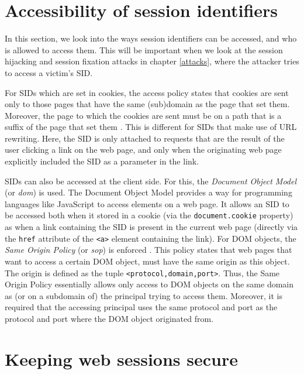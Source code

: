 \section{Accessibility of session identifiers}

In this section, we look into the ways session identifiers can be accessed, and who is allowed to access them. This will be important when we look at the \gls{session hijacking} and \gls{session fixation} attacks in chapter \ref{attacks}, where the attacker tries to access a victim's SID.

\label{access-control}For SIDs which are set in cookies, the access policy states that cookies are sent only to those pages that have the same (sub)domain as the page that set them. Moreover, the page to which the cookies are sent must be on a path that is a suffix of the page that set them \cite{Singh2010}. This is different for SIDs that make use of URL rewriting. Here, the SID is only attached to requests that are the result of the user clicking a link on the web page, and only when the originating web page explicitly included the SID as a parameter in the link.

\label{sop}SIDs can also be accessed at the client side. For this, the \emph{Document Object Model} (or \emph{\gls{dom}}) is used. The Document Object Model provides a way for programming languages like JavaScript to access elements on a web page. It allows an SID to be accessed both when it stored in a cookie (via the \texttt{document.cookie} property) as when a link containing the SID is present in the current web page (directly via the \texttt{href} attribute of the \texttt{<a>} element containing the link). For DOM objects, the \emph{Same Origin Policy} (or \emph{\gls{sop}}) is enforced \cite{Singh2010}. This policy states that web pages that want to access a certain DOM object, must have the same origin as this object. The origin is defined as the tuple \texttt{<protocol,domain,port>}. Thus, the Same Origin Policy essentially allows only access to DOM objects on the same domain as (or on a subdomain of) the principal trying to access them. Moreover, it is required that the accessing principal uses the same protocol and port as the protocol and port where the DOM object originated from.

\section{Keeping web sessions secure}\label{secure-sessions}

